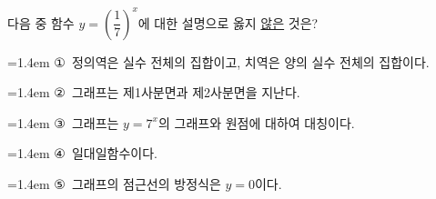 다음 중 함수 $y=\left(\dfrac{1}{7}\right)^{x}$에 대한 설명으로 옳지 \underline{않은} 것은?
\par\medskip\par\noindent\hangindent=1.4em {\small ①}\ 정의역은 실수 전체의 집합이고, 치역은 양의 실수 전체의 집합이다.\par\noindent\hangindent=1.4em {\small ②}\ 그래프는 제1사분면과 제2사분면을 지난다.\par\noindent\hangindent=1.4em {\small ③}\ 그래프는 $y=7^{x}$의 그래프와 원점에 대하여 대칭이다.\par\noindent\hangindent=1.4em {\small ④}\ 일대일함수이다.\par\noindent\hangindent=1.4em {\small ⑤}\ 그래프의 점근선의 방정식은 $y=0$이다.\par\medskip
